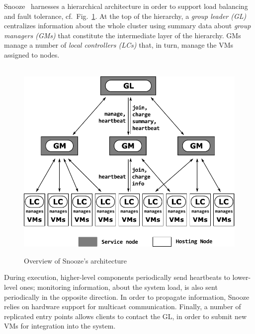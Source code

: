 

Snooze~\cite{snoozeweb,snoozedev14} harnesses a hierarchical
architecture in order to support load balancing and fault tolerance,
cf.\ Fig.~\ref{fig:snoozearch}. At the top of the hierarchy, a
\emph{group leader (GL)} centralizes information about the whole
cluster using summary data about \emph{group managers (GMs)} that
constitute the intermediate layer of the hierarchy. GMs manage a
number of \emph{local controllers (LCs)} that, in turn, manage the VMs
assigned to nodes.

\begin{figure}
  {\centering ~\includegraphics[width=.99\linewidth]{figures/snoozearch.pdf}}
  \caption{Overview of Snooze's architecture}
  \label{fig:snoozearch}
\end{figure}
During execution, higher-level components periodically send heartbeats
to lower-level ones; monitoring information, \eg about the system
load, is also sent periodically in the opposite direction. In order to
propagate information, Snooze relies on hardware support for multicast
communication. Finally, a number of replicated entry points allows
clients to contact the GL, \eg in order to submit new VMs for
integration into the system.

